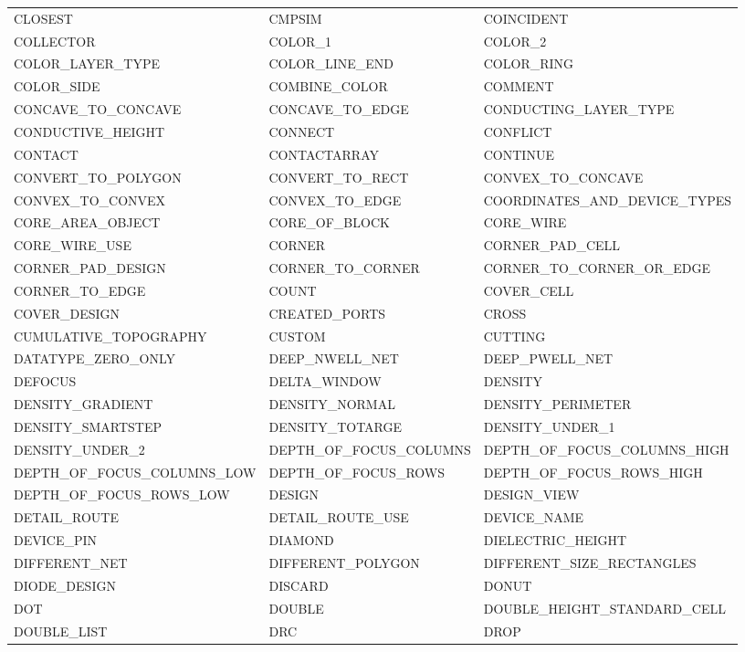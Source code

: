 \begin{longtable}{@{}>{\raggedright\arraybackslash\ttfamily}p{} >{\raggedright\arraybackslash\ttfamily}p{} >{\raggedright\arraybackslash\ttfamily}p{}@{}}
CLOSEST & CMPSIM & COINCIDENT \\
COLLECTOR & COLOR\_1 & COLOR\_2 \\
COLOR\_LAYER\_TYPE & COLOR\_LINE\_END & COLOR\_RING \\
COLOR\_SIDE & COMBINE\_COLOR & COMMENT \\
CONCAVE\_TO\_CONCAVE & CONCAVE\_TO\_EDGE & CONDUCTING\_LAYER\_TYPE \\
CONDUCTIVE\_HEIGHT & CONNECT & CONFLICT \\
CONTACT & CONTACTARRAY & CONTINUE \\
CONVERT\_TO\_POLYGON & CONVERT\_TO\_RECT & CONVEX\_TO\_CONCAVE \\
CONVEX\_TO\_CONVEX & CONVEX\_TO\_EDGE & COORDINATES\_AND\_DEVICE\_TYPES \\
CORE\_AREA\_OBJECT & CORE\_OF\_BLOCK & CORE\_WIRE \\
CORE\_WIRE\_USE & CORNER & CORNER\_PAD\_CELL \\
CORNER\_PAD\_DESIGN & CORNER\_TO\_CORNER & CORNER\_TO\_CORNER\_OR\_EDGE \\
CORNER\_TO\_EDGE & COUNT & COVER\_CELL \\
COVER\_DESIGN & CREATED\_PORTS & CROSS \\
CUMULATIVE\_TOPOGRAPHY & CUSTOM & CUTTING \\
DATATYPE\_ZERO\_ONLY & DEEP\_NWELL\_NET & DEEP\_PWELL\_NET \\
DEFOCUS & DELTA\_WINDOW & DENSITY \\
DENSITY\_GRADIENT & DENSITY\_NORMAL & DENSITY\_PERIMETER \\
DENSITY\_SMARTSTEP & DENSITY\_TOTARGE & DENSITY\_UNDER\_1 \\
DENSITY\_UNDER\_2 & DEPTH\_OF\_FOCUS\_COLUMNS & DEPTH\_OF\_FOCUS\_COLUMNS\_HIGH \\
DEPTH\_OF\_FOCUS\_COLUMNS\_LOW & DEPTH\_OF\_FOCUS\_ROWS & DEPTH\_OF\_FOCUS\_ROWS\_HIGH \\
DEPTH\_OF\_FOCUS\_ROWS\_LOW & DESIGN & DESIGN\_VIEW \\
DETAIL\_ROUTE & DETAIL\_ROUTE\_USE & DEVICE\_NAME \\
DEVICE\_PIN & DIAMOND & DIELECTRIC\_HEIGHT \\
DIFFERENT\_NET & DIFFERENT\_POLYGON & DIFFERENT\_SIZE\_RECTANGLES \\
DIODE\_DESIGN & DISCARD & DONUT \\
DOT & DOUBLE & DOUBLE\_HEIGHT\_STANDARD\_CELL \\
DOUBLE\_LIST & DRC & DROP \\

\end{longtable}
